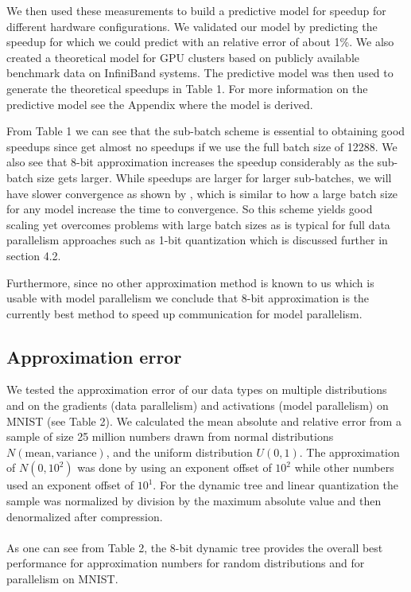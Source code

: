 \documentclass{article} %
\begin{document}
We then used these measurements to build a predictive model for speedup for different hardware configurations. We validated our model by predicting the speedup for \citet{krizhevsky2014one} which we could predict with an relative error of about 1\%. We also created a theoretical model for GPU clusters based on publicly available benchmark data on InfiniBand systems. The predictive model was then used to generate the theoretical speedups in Table 1. For more information on the predictive model see the Appendix where the model is derived.

From Table 1 we can see that the sub-batch scheme is essential to obtaining good speedups since get almost no speedups if we use the full batch size of 12288. We also see that 8-bit approximation increases the speedup considerably as the sub-batch size gets larger. While speedups are larger for larger sub-batches, we will have slower convergence as shown by \citet{krizhevsky2014one}, which is similar to how a large batch size for any model increase the time to convergence. So this scheme yields good scaling yet overcomes problems with large batch sizes as is typical for full data parallelism approaches such as 1-bit quantization which is discussed further in section 4.2.

Furthermore, since no other approximation method is known to us which is usable with model parallelism we conclude that 8-bit approximation is the currently best method to speed up communication for model parallelism. 

\subsection{Approximation error}

We tested the approximation error of our data types on multiple distributions and on the gradients (data parallelism) and activations (model parallelism) on MNIST (see Table 2). We calculated the mean absolute and relative error from a sample of size 25 million numbers drawn from normal distributions $N(\mbox{mean},\mbox{variance})$, and the uniform distribution $U(0,1)$. The approximation of $N(0,10^2)$ was done by using an exponent offset of $10^2$ while other numbers used an exponent offset of $10^1$. For the dynamic tree and linear quantization the sample was normalized by division by the maximum absolute value and then denormalized after compression. \\\\
As one can see from Table 2, the 8-bit dynamic tree provides the overall best performance for approximation numbers for random distributions and for parallelism on MNIST. 
\end{document}
